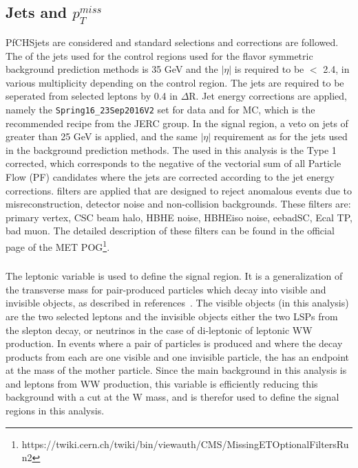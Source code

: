 \subsection{Jets and $p_{T}^{miss}$}
\label{subsec:jets}
PfCHSjets are considered and standard selections and corrections are followed. The \pt of the jets used for the control regions used for the flavor symmetric background prediction methods 
is 35 GeV and the $|\eta|$ is required to be $<$ 2.4, in various multiplicity depending on the control region. 
The jets are required to be seperated from selected leptons by 0.4 in $\Delta$R. Jet energy corrections are applied, namely the \texttt{Spring16\_23Sep2016V2} set for data and for MC, 
which is the recommended recipe from the JERC group. In the signal region, a veto on jets of \pt greater than 25 GeV is applied, and the same $|\eta|$ requirement as for the jets used 
in the background prediction methods.
The \ptmiss used in this analysis is the Type 1 corrected, which corresponds to the negative of the vectorial sum of all Particle Flow (PF) candidates where the jets are corrected according to the 
jet energy corrections. \ptmiss filters are applied that are designed to reject anomalous \ptmiss events due to misreconstruction, detector noise and non-collision backgrounds. These filters are: 
primary vertex, CSC beam halo, HBHE noise, HBHEiso noise, eebadSC, Ecal TP, bad muon. The detailed
description of these filters can be found in the official page of the MET POG\footnote{https://twiki.cern.ch/twiki/bin/viewauth/CMS/MissingETOptionalFiltersRun2}. 
\subsubsection{\mttwo}
\label{subsec:MT2}
The leptonic \mttwo variable is used to define the signal region. It is a generalization of the transverse mass for pair-produced particles which decay into visible and invisible objects, as 
described in references~\cite{MT2variable,MT2variable2}. The visible objects (in this analysis) are the two selected leptons and the invisible objects either the two LSPs from the slepton decay, 
or neutrinos in the case of di-leptonic \ttbar of leptonic WW production. In events where a pair of particles is produced and where the decay products from each are one visible and one invisible 
particle, the \mttwo has an endpoint at the mass of 
the mother particle. Since the main background in this analysis is \ttbar and leptons from WW production, this variable is efficiently reducing this background with a cut at the W mass, and is 
therefor used to define the signal regions in this analysis.
